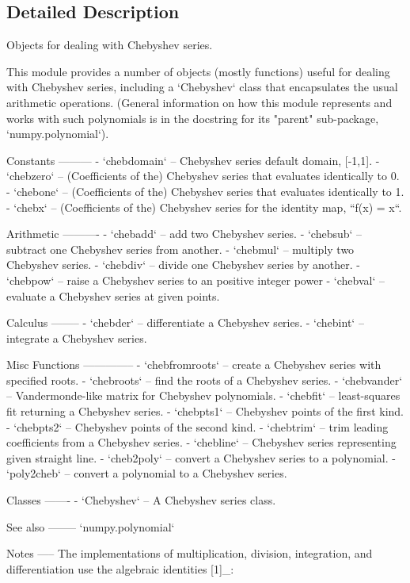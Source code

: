 \subsection{Detailed Description}
\begin{DoxyVerb}Objects for dealing with Chebyshev series.

This module provides a number of objects (mostly functions) useful for
dealing with Chebyshev series, including a `Chebyshev` class that
encapsulates the usual arithmetic operations.  (General information
on how this module represents and works with such polynomials is in the
docstring for its "parent" sub-package, `numpy.polynomial`).

Constants
---------
- `chebdomain` -- Chebyshev series default domain, [-1,1].
- `chebzero` -- (Coefficients of the) Chebyshev series that evaluates
  identically to 0.
- `chebone` -- (Coefficients of the) Chebyshev series that evaluates
  identically to 1.
- `chebx` -- (Coefficients of the) Chebyshev series for the identity map,
  ``f(x) = x``.

Arithmetic
----------
- `chebadd` -- add two Chebyshev series.
- `chebsub` -- subtract one Chebyshev series from another.
- `chebmul` -- multiply two Chebyshev series.
- `chebdiv` -- divide one Chebyshev series by another.
- `chebpow` -- raise a Chebyshev series to an positive integer power
- `chebval` -- evaluate a Chebyshev series at given points.

Calculus
--------
- `chebder` -- differentiate a Chebyshev series.
- `chebint` -- integrate a Chebyshev series.

Misc Functions
--------------
- `chebfromroots` -- create a Chebyshev series with specified roots.
- `chebroots` -- find the roots of a Chebyshev series.
- `chebvander` -- Vandermonde-like matrix for Chebyshev polynomials.
- `chebfit` -- least-squares fit returning a Chebyshev series.
- `chebpts1` -- Chebyshev points of the first kind.
- `chebpts2` -- Chebyshev points of the second kind.
- `chebtrim` -- trim leading coefficients from a Chebyshev series.
- `chebline` -- Chebyshev series representing given straight line.
- `cheb2poly` -- convert a Chebyshev series to a polynomial.
- `poly2cheb` -- convert a polynomial to a Chebyshev series.

Classes
-------
- `Chebyshev` -- A Chebyshev series class.

See also
--------
`numpy.polynomial`

Notes
-----
The implementations of multiplication, division, integration, and
differentiation use the algebraic identities [1]_:


\end{DoxyVerb}
